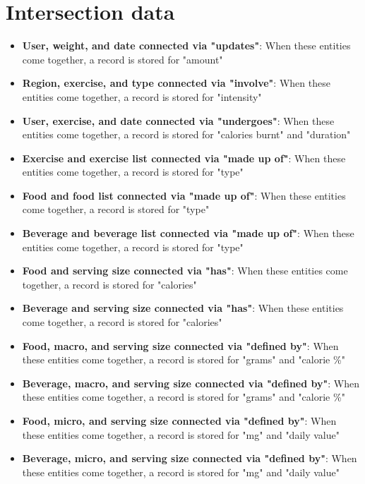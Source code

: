 \documentclass{report}
\begin{document}
    \section{Intersection data}
    \begin{itemize}
        \item \textbf{User, weight, and date connected via "updates"}: When these entities come together, a record is stored for "amount" 
        \item \textbf{Region, exercise, and type connected via "involve"}: When these entities come together, a record is stored for "intensity"
        \item \textbf{User, exercise, and date connected via "undergoes"}: When these entities come together, a record is stored for "calories burnt" and "duration"
        \item \textbf{Exercise and exercise list connected via "made up of"}: When these entities come together, a record is stored for "type" 
        \item \textbf{Food and food list connected via "made up of"}: When these entities come together, a record is stored for "type"
        \item \textbf{Beverage and beverage list connected via "made up of"}: When these entities come together, a record is stored for "type"
        \item \textbf{Food and serving size connected via "has"}: When these entities come together, a record is stored for "calories"
        \item \textbf{Beverage and serving size connected via "has"}: When these entities come together, a record is stored for "calories"
        \item \textbf{Food, macro, and serving size connected via "defined by"}: When these entities come together, a record is stored for "grams" and "calorie \%"
        \item \textbf{Beverage, macro, and serving size connected via "defined by"}: When these entities come together, a record is stored for "grams" and "calorie \%"
        \item \textbf{Food, micro, and serving size connected via "defined by"}: When these entities come together, a record is stored for "mg" and "daily value"
        \item \textbf{Beverage, micro, and serving size connected via "defined by"}: When these entities come together, a record is stored for "mg" and "daily value"
    \end{itemize}



    
\end{document}
